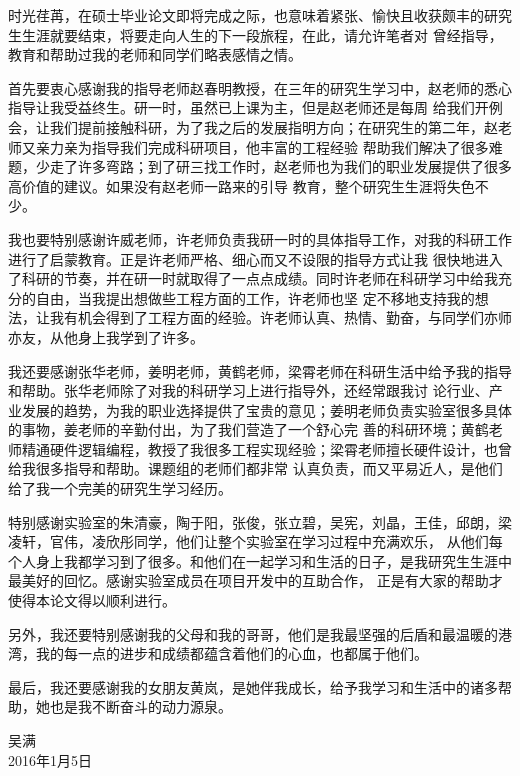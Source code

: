 
\begin{Acknowledgement}
时光荏苒，在硕士毕业论文即将完成之际，也意味着紧张、愉快且收获颇丰的研究生生涯就要结束，将要走向人生的下一段旅程，在此，请允许笔者对
曾经指导，教育和帮助过我的老师和同学们略表感情之情。

首先要衷心感谢我的指导老师赵春明教授，在三年的研究生学习中，赵老师的悉心指导让我受益终生。研一时，虽然已上课为主，但是赵老师还是每周
给我们开例会，让我们提前接触科研，为了我之后的发展指明方向；在研究生的第二年，赵老师又亲力亲为指导我们完成科研项目，他丰富的工程经验
帮助我们解决了很多难题，少走了许多弯路；到了研三找工作时，赵老师也为我们的职业发展提供了很多高价值的建议。如果没有赵老师一路来的引导
教育，整个研究生生涯将失色不少。

我也要特别感谢许威老师，许老师负责我研一时的具体指导工作，对我的科研工作进行了启蒙教育。正是许老师严格、细心而又不设限的指导方式让我
很快地进入了科研的节奏，并在研一时就取得了一点点成绩。同时许老师在科研学习中给我充分的自由，当我提出想做些工程方面的工作，许老师也坚
定不移地支持我的想法，让我有机会得到了工程方面的经验。许老师认真、热情、勤奋，与同学们亦师亦友，从他身上我学到了许多。

我还要感谢张华老师，姜明老师，黄鹤老师，梁霄老师在科研生活中给予我的指导和帮助。张华老师除了对我的科研学习上进行指导外，还经常跟我讨
论行业、产业发展的趋势，为我的职业选择提供了宝贵的意见；姜明老师负责实验室很多具体的事物，姜老师的辛勤付出，为了我们营造了一个舒心完
善的科研环境；黄鹤老师精通硬件逻辑编程，教授了我很多工程实现经验；梁霄老师擅长硬件设计，也曾给我很多指导和帮助。课题组的老师们都非常
认真负责，而又平易近人，是他们给了我一个完美的研究生学习经历。

特别感谢实验室的朱清豪，陶于阳，张俊，张立碧，吴宪，刘晶，王佳，邱朗，梁凌轩，官伟，凌欣彤同学，他们让整个实验室在学习过程中充满欢乐，
从他们每个人身上我都学习到了很多。和他们在一起学习和生活的日子，是我研究生生涯中最美好的回忆。感谢实验室成员在项目开发中的互助合作，
正是有大家的帮助才使得本论文得以顺利进行。

另外，我还要特别感谢我的父母和我的哥哥，他们是我最坚强的后盾和最温暖的港湾，我的每一点的进步和成绩都蕴含着他们的心血，也都属于他们。

最后，我还要感谢我的女朋友黄岚，是她伴我成长，给予我学习和生活中的诸多帮助，她也是我不断奋斗的动力源泉。
\begin{flushright}
吴满\\
2016年1月5日\\
\end{flushright}

\end{Acknowledgement}
